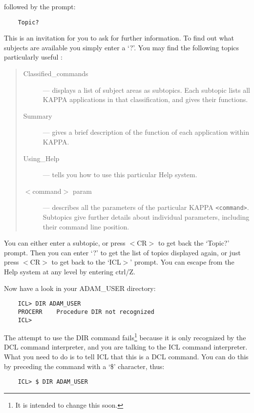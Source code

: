 followed by the prompt:

\begin{small}
\begin{verbatim}
    Topic?
\end{verbatim}
\end{small}

This is an invitation for you to ask for further information.
To find out what subjects are available you simply enter a `?'.
You may find the following topics particularly useful :
\begin{quote}
\begin{description}
\item [Classified\_commands] --- displays a list of subject areas as subtopics.
Each subtopic lists all KAPPA applications in that classification, and gives
their functions.
\item [Summary] --- gives a brief description of the function of each
application within KAPPA.
\item [Using\_Help] --- tells you how to use this particular Help system.
\item [$<$command$>$ param] --- describes all the parameters of the particular
KAPPA  {\tt <command>}.
Subtopics give further details about individual parameters, including their
command line position.
\end{description}
\end{quote}
You can either enter a subtopic, or press $<$CR$>$ to get back the `Topic?'
prompt.
Then you can enter `?' to get the list of topics displayed again, or just
press $<$CR$>$ to get back to the `ICL$>$' prompt.
You can escape from the Help system at any level by entering ctrl/Z.

Now have a look in your ADAM\_USER directory:

\begin{small}
\begin{verbatim}
    ICL> DIR ADAM_USER
    PROCERR    Procedure DIR not recognized
    ICL>
\end{verbatim}
\end{small}

The attempt to use the DIR command fails\footnote{It is intended to change
this soon.} because it is only recognized by the DCL command interpreter, and
you are talking to the ICL command interpreter.
What you need to do is to tell ICL that this is a DCL command.
You can do this by preceding the command with a `\$' character, thus:

\begin{small}
\begin{verbatim}
    ICL> $ DIR ADAM_USER
\end{verbatim}
\end{small}

